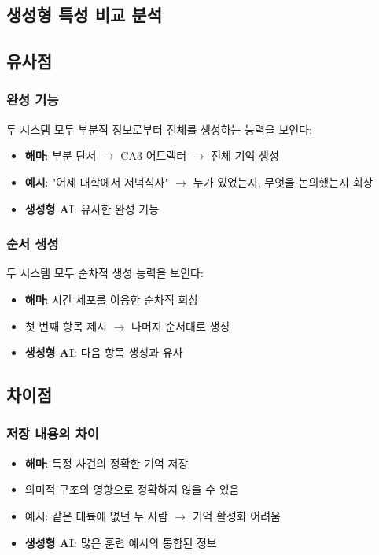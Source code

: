 \documentclass[openany]{book}
\begin{document}
\begin{appendices}
\section{생성형 특성 비교 분석}

\subsection{유사점}

\subsubsection{완성 기능}
두 시스템 모두 부분적 정보로부터 전체를 생성하는 능력을 보인다:

\begin{itemize}
\item \textbf{해마}: 부분 단서 $\rightarrow$ CA3 어트랙터 $\rightarrow$ 전체 기억 생성
\item \textbf{예시}: "어제 대학에서 저녁식사" $\rightarrow$ 누가 있었는지, 무엇을 논의했는지 회상
\item \textbf{생성형 AI}: 유사한 완성 기능
\end{itemize}

\subsubsection{순서 생성}
두 시스템 모두 순차적 생성 능력을 보인다:

\begin{itemize}
\item \textbf{해마}: 시간 세포를 이용한 순차적 회상
\item 첫 번째 항목 제시 $\rightarrow$ 나머지 순서대로 생성
\item \textbf{생성형 AI}: 다음 항목 생성과 유사
\end{itemize}

\subsection{차이점}

\subsubsection{저장 내용의 차이}
\begin{itemize}
\item \textbf{해마}: 특정 사건의 정확한 기억 저장
\item 의미적 구조의 영향으로 정확하지 않을 수 있음
\item 예시: 같은 대륙에 없던 두 사람 $\rightarrow$ 기억 활성화 어려움
\item \textbf{생성형 AI}: 많은 훈련 예시의 통합된 정보
\end{itemize}


\end{appendices}
\end{document}
